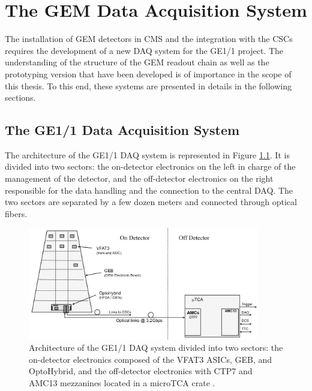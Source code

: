 \chapter{The GEM Data Acquisition System}
\label{chap:II-2-daq}

  The installation of GEM detectors in CMS and the integration with the CSCs requires the development of a new DAQ system for the GE1/1 project. The understanding of the structure of the GEM readout chain as well as the prototyping version that have been developed is of importance in the scope of this thesis. To this end, these systems are presented in details in the following sections. \\

  \section{The GE1/1 Data Acquisition System}

    The architecture of the GE1/1 DAQ system is represented in Figure \ref{fig:II-2-gem-system}. It is divided into two sectors: the on-detector electronics on the left in charge of the management of the detector, and the off-detector electronics on the right responsible for the data handling and the connection to the central DAQ. The two sectors are separated by a few dozen meters and connected through optical fibers. \\

    \begin{figure}[b!]
      \centering
      \includegraphics[width=0.9\textwidth]{img/II-2-daq/gem-system.pdf}
      \caption{Architecture of the GE1/1 DAQ system divided into two sectors: the on-detector electronics composed of the VFAT3 ASICs, GEB, and OptoHybrid, and the off-detector electronics with CTP7 and AMC13 mezzanines located in a microTCA crate \cite{Colaleo:2021453}.}
      \label{fig:II-2-gem-system}
    \end{figure}

